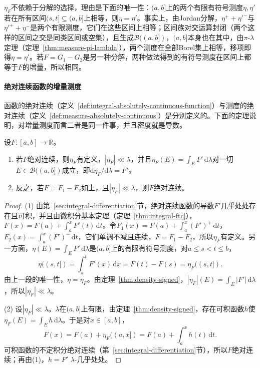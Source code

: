 $\eta_F$不依赖于分解的选择，理由是下面的唯一性：$(a,b]$上的两个有限有符号测度$\eta,\eta'$若在所有区间$(s,t]\subseteq(a,b]$上相等，则$\eta=\eta'$。事实上，由Jordan分解，$\eta^++\eta'^-$与$\eta'^++\eta^-$是两个有限测度，它们在这些区间上相等；区间族对交运算封闭（两个这样的区间之交是同类区间或空集），且生成$\mathcal B((a,b])$，$(a,b]$本身也在其中，由$\pi$-$\lambda$定理（定理~\ref{thm:measure-pi-lambda}），两个测度在全部Borel集上相等，移项即得$\eta=\eta'$。若$F=G_1-G_2$是另一种分解，两种做法得到的有符号测度在区间上都等于$F$的增量，所以相同。

\paragraph{绝对连续函数的增量测度}
函数的绝对连续（定义~\ref{def:integral-absolutely-continuous-function}）与测度的绝对连续（定义~\ref{def:measure-absolutely-continuous}）是分别定义的。下面的定理说明，对增量测度而言二者是同一件事，并且密度就是导数。

\begin{theorem}[增量测度的密度]
\label{thm:density-increment}
设$F:[a,b]\to\mathbb R$。
\begin{enumerate}
 \item 若$F$绝对连续，则$\eta_F$有定义，$|\eta_F|\ll\lambda$，并且$\eta_F(E)=\int_EF'\,\mathrm d\lambda$对一切$E\in\mathcal B((a,b])$成立，即$\mathrm d\eta_F/\mathrm d\lambda=F'$。
 \item 反之，若$F=F_1-F_2$如上，且$|\eta_F|\ll\lambda$，则$F$绝对连续。
\end{enumerate}
\end{theorem}

\begin{proof}
(1) 由第~\ref{sec:integral-differentiation}节，绝对连续函数的导数$F'$几乎处处存在且可积，并且由微积分基本定理（定理~\ref{thm:integral-ftc}），$F(x)=F(a)+\int_a^xF'(t)\,\mathrm dt$。令$F_1(x)=F(a)+\int_a^x(F')^+\,\mathrm dt$，$F_2(x)=\int_a^x(F')^-\,\mathrm dt$，它们单调不减且连续，$F=F_1-F_2$，所以$\eta_F$有定义。另一方面，$\eta(E)=\int_EF'\,\mathrm d\lambda$是$(a,b]$上的有限有符号测度，对$a\le s<t\le b$，
\[
 \eta((s,t])=\int_s^tF'(x)\,\mathrm dx=F(t)-F(s)=\eta_F((s,t]).
\]
由上一段的唯一性，$\eta=\eta_F$。由定理~\ref{thm:density-signed}，$|\eta_F|(E)=\int_E|F'|\,\mathrm d\lambda$，所以$|\eta_F|\ll\lambda$。

(2) 设$|\eta_F|\ll\lambda$。$\lambda$在$(a,b]$上有限，由定理~\ref{thm:density-signed}，存在可积函数$h$使$\eta_F(E)=\int_Eh\,\mathrm d\lambda$。于是对$x\in[a,b]$，
\[
 F(x)=F(a)+\eta_F((a,x])=F(a)+\int_a^xh(t)\,\mathrm dt .
\]
可积函数的不定积分绝对连续（第~\ref{sec:integral-differentiation}节），所以$F$绝对连续；再由(1)，$h=F'$ $\lambda$-几乎处处。
\end{proof}

